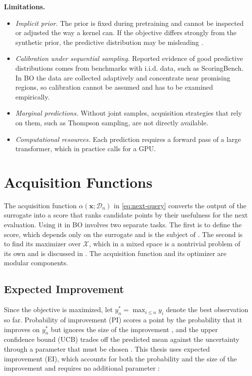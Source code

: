 \textbf{Limitations.}

\begin{itemize}
  \item \textit{Implicit prior.} The prior is fixed during pretraining and cannot be inspected or adjusted the way a kernel can. If the objective differs strongly from the synthetic prior, the predictive distribution may be misleading \citep{pmlr-v202-nagler23a}.
  \item \textit{Calibration under sequential sampling.} Reported evidence of good predictive distributions comes from benchmarks with i.i.d. data, such as ScoringBench. In BO the data are collected adaptively and concentrate near promising regions, so calibration cannot be assumed and has to be examined empirically.
  \item \textit{Marginal predictions.} Without joint samples, acquisition strategies that rely on them, such as Thompson sampling, are not directly available.
  \item \textit{Computational resources.} Each prediction requires a forward pass of a large transformer, which in practice calls for a GPU. %
\end{itemize}

\section{Acquisition Functions}\label{sec:acquisition-functions}

The acquisition function $\alpha(\boldsymbol{x}; \mathcal{D}_n)$ in \eqref{eq:next-query} converts the output of the surrogate into a score that ranks candidate points by their usefulness for the next evaluation. Using it in BO involves two separate tasks. The first is to define the score, which depends only on the surrogate and is the subject of . The second is to find its maximizer over $\mathcal{X}$, which in a mixed space is a nontrivial problem of its own and is discussed in . The acquisition function and its optimizer are modular components.

\subsection{Expected Improvement}\label{subsec:expected-improvement}

Since the objective is maximized, let $y_n^* = \max_{i \le n} y_i$ denote the best observation so far. Probability of improvement (PI) scores a point by the probability that it improves on $y_n^*$ but ignores the size of the improvement \citep{10.1115/1.3653121}, and the upper confidence bound (UCB) trades off the predicted mean against the uncertainty through a parameter that must be chosen \citep{3104322.3104451}. This thesis uses expected improvement (EI), which accounts for both the probability and the size of the improvement and requires no additional parameter \citep{646296.687872, jones1998efficient}:

